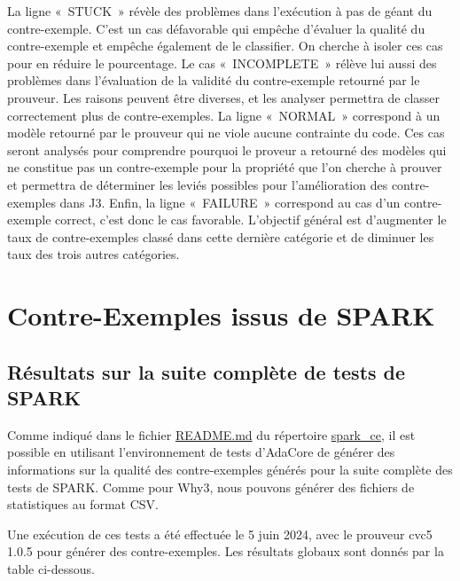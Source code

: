 \documentclass[a4paper,11pt]{article}
\begin{document}
La ligne «~STUCK~» révèle des problèmes dans l'exécution à pas de géant du
contre-exemple. C'est un cas défavorable qui empêche d'évaluer la qualité
du contre-exemple et empêche également de le classifier.
On cherche à isoler ces cas pour en réduire le pourcentage.
Le cas «~INCOMPLETE~» rélève lui aussi des problèmes dans l'évaluation de
la validité du contre-exemple retourné par le prouveur. Les raisons
peuvent être diverses, et les analyser permettra de classer correctement plus
de contre-exemples.
La ligne «~NORMAL~» correspond à un modèle retourné par le prouveur qui ne
viole aucune contrainte du code. Ces cas seront analysés pour comprendre
pourquoi le proveur a retourné des modèles qui ne constitue pas un
contre-exemple pour la propriété que l'on cherche à prouver et permettra de
déterminer les leviés possibles pour l'amélioration des contre-exemples dans J3.
Enfin, la ligne «~FAILURE~» correspond au cas d'un contre-exemple correct, c'est
donc le cas favorable. L'objectif général est d'augmenter le taux
de contre-exemples classé dans cette dernière catégorie et de diminuer les
taux des trois autres catégories.

\section{Contre-Exemples issus de SPARK}

\subsection{Résultats sur la suite complète de tests de SPARK}

Comme indiqué dans le fichier \url{README.md} du répertoire \url{spark_ce}, il est
possible en utilisant l'environnement de tests d'AdaCore de générer des
informations sur la qualité des contre-exemples générés pour la suite complète
des tests de SPARK. Comme pour Why3, nous pouvons générer des fichiers de
statistiques au format CSV.

Une exécution de ces tests a été effectuée le 5 juin 2024, avec le prouveur cvc5
1.0.5 pour générer des contre-exemples. Les résultats globaux sont donnés par la
table ci-dessous.
\end{document}
